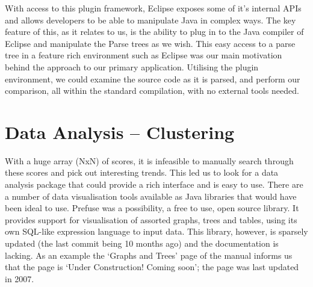 With access to this plugin framework, Eclipse exposes some of it's internal APIs
and allows developers to be able to manipulate Java in complex ways. The key feature
of this, as it relates to us, is the ability to plug in to the Java compiler of Eclipse
and manipulate the Parse trees as we wish. This easy access to a parse tree in a
feature rich environment such as Eclipse was our main motivation behind the approach
to our primary application. Utilising the plugin environment, we could examine the
source code as it is parsed, and perform our comparison, all within the standard
compilation, with no external tools needed.

\section{Data Analysis -- Clustering}

With a huge array (NxN) of scores, it is infeasible to manually search through
these scores and pick out interesting trends. This led us to look for a data
analysis package that could provide a rich interface and is easy to use. There
are a number of data visualisation tools available as Java libraries that would
have been ideal to use. Prefuse\cite{Prefuse} was a possibility, a free
to use, open source library. It provides support for visualisation of assorted
graphs, trees and tables, using its own SQL-like expression language to input
data. This library, however, is sparsely updated (the last commit being 10
months ago) and the documentation is lacking. As an example the `Graphs and
Trees' page of the manual informs us that the page is `Under Construction!
Coming soon'; the page was last updated in 2007.

